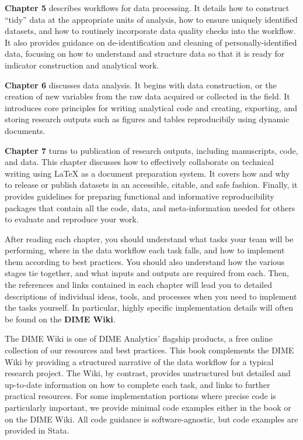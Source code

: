 \textbf{Chapter 5} describes workflows for data processing.
It details how to construct ``tidy'' data at the appropriate units of analysis,
how to ensure uniquely identified datasets, and
how to routinely incorporate data quality checks into the workflow.
It also provides guidance on de-identification and cleaning of personally-identified data,
focusing on how to understand and structure data
so that it is ready for indicator construction and analytical work.

\textbf{Chapter 6} discusses data analysis.
It begins with data construction, or the creation of new variables
from the raw data acquired or collected in the field.
It introduces core principles for writing analytical code
and creating, exporting, and storing research outputs
such as figures and tables reproducibily using dynamic documents.

\textbf{Chapter 7} turns to publication of research outputs,
including manuscripts, code, and data.
This chapter discusses
how to effectively collaborate on technical writing
using {\LaTeX} as a document preparation system.
It covers how and why to release or publish datasets
in an accessible, citable, and safe fashion.
Finally, it provides guidelines for preparing
functional and informative reproducibility packages
that contain all the code, data, and meta-information needed
for others to evaluate and reproduce your work.

After reading each chapter, you should understand
what tasks your team will be performing,
where in the data workflow each task falls,
and how to implement them according to best practices.
You should also understand how the various stages tie together,
and what inputs and outputs are required from each.
Then, the references and links contained in each chapter
will lead you to detailed descriptions of individual
ideas, tools, and processes when you need to implement the tasks yourself.
In particular, highly specific implementation details
will often be found on the \textbf{DIME Wiki}.

The DIME Wiki is one of DIME Analytics' flagship products,
a free online collection of our resources and best practices.
This book complements the DIME Wiki by providing a structured narrative
of the data workflow for a typical research project.
The Wiki, by contrast, provides unstructured but detailed and up-to-date information
on how to complete each task, and links to further practical resources.
For some implementation portions where precise code is particularly important,
we provide minimal code examples either in the book or on the DIME Wiki.
All code guidance is software-agnostic, but code examples are provided in Stata.

